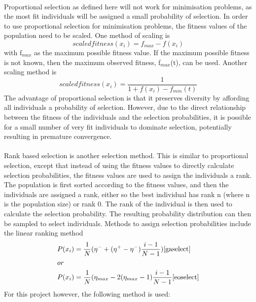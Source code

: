 \\Proportional selection as defined here will not work for minimisation problems, as the most fit individuals will be assigned a small probability of selection. In order to use proportional selection for minimisation problems, the fitness values of the population need to be scaled. One method of scaling is\cite{4-se}
\begin{equation}
  scaled fitness(x_{i}) = f_{max} - f(x_{i})
\end{equation}
with f$_{max}$ as the maximum possible fitness value. If the maximum possible fitness is not known, then the maximum observed fitness, f$_{max}$(t), can be used. Another scaling method is\cite{4-se}
\begin{equation}
  scaled fitness(x_{i}) = \frac{1}{1 + f(x_{i}) - f_{min}(t)}
\end{equation}
The advantage of proportional selection is that it preserves diversity by affording all individuals a probability of selection\cite{gatsp, eoselect}. However, due to the direct relationship between the fitness of the individuals and the selection probabilities, it is possible for a small number of very fit individuals to dominate selection, potentially resulting in premature convergence\cite{4-se, gatsp}.
\\\\Rank based selection is another selection method. This is similar to proportional selection, except that instead of using the fitness values to directly calculate selection probabilities, the fitness values are used to assign the individuals a rank. The population is first sorted according to the fitness values, and then the individuals are assigned a rank, either so the best individual has rank n (where n is the population size)\cite{gaselect} or rank 0\cite{4-se}. The rank of the individual is then used to calculate the selection probability. The resulting probability distribution can then be sampled to select individuals. Methods to assign selection probabilities include the linear ranking method
\begin{equation}
  \begin{split}
  &P(x_{i}) = \frac{1}{N}(\eta^{-}+(\eta^{+}-\eta^{-})\frac{i-1}{N-1})\text{\cite{gaselect}} \\
  &or \\
  &P(x_{i}) = \frac{1}{N}(\eta_{max}-2(\eta_{max}-1)\frac{i-1}{N-1}\text{\cite{eoselect}}
  \end{split}
\end{equation}  
For this project however, the following method is used\cite{l2}:
